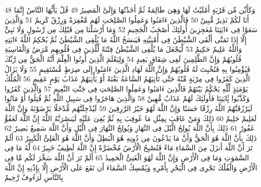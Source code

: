 \documentclass[20pt,a4paper]{article}
\begin{document}
{\tiny\colorbox{cl_aya}{48}} وَكَأَيِّن مِّن قَرْيَةٍ أَمْلَيْتُ لَهَا وَهِىَ ظَالِمَةٌ ثُمَّ أَخَذْتُهَا وَإِلَىَّ الْمَصِيرُ
{\tiny\colorbox{cl_aya}{49}} قُلْ يَأَيُّهَا النَّاسُ إِنَّمَا أَنَا لَكُمْ نَذِيرٌ مُّبِينٌ
{\tiny\colorbox{cl_aya}{50}} فَالَّذِينَ ءَامَنُوا وَعَمِلُوا الصَّلِحَتِ لَهُم مَّغْفِرَةٌ وَرِزْقٌ كَرِيمٌ
{\tiny\colorbox{cl_aya}{51}} وَالَّذِينَ سَعَوْا فِى ءَايَتِنَا مُعَجِزِينَ أُولَئِكَ أَصْحَبُ الْجَحِيمِ
{\tiny\colorbox{cl_aya}{52}} وَمَا أَرْسَلْنَا مِن قَبْلِكَ مِن رَّسُولٍ وَلَا نَبِىٍّ إِلَّا إِذَا تَمَنَّى أَلْقَى الشَّيْطَنُ فِى أُمْنِيَّتِهِ فَيَنسَخُ اللَّهُ مَا يُلْقِى الشَّيْطَنُ ثُمَّ يُحْكِمُ اللَّهُ ءَايَتِهِ وَاللَّهُ عَلِيمٌ حَكِيمٌ
{\tiny\colorbox{cl_aya}{53}} لِّيَجْعَلَ مَا يُلْقِى الشَّيْطَنُ فِتْنَةً لِّلَّذِينَ فِى قُلُوبِهِم مَّرَضٌ وَالْقَاسِيَةِ قُلُوبُهُمْ وَإِنَّ الظَّلِمِينَ لَفِى شِقَاقٍ بَعِيدٍ
{\tiny\colorbox{cl_aya}{54}} وَلِيَعْلَمَ الَّذِينَ أُوتُوا الْعِلْمَ أَنَّهُ الْحَقُّ مِن رَّبِّكَ فَيُؤْمِنُوا بِهِ فَتُخْبِتَ لَهُ قُلُوبُهُمْ وَإِنَّ اللَّهَ لَهَادِ الَّذِينَ ءَامَنُوا إِلَى صِرَطٍ مُّسْتَقِيمٍ
{\tiny\colorbox{cl_aya}{55}} وَلَا يَزَالُ الَّذِينَ كَفَرُوا فِى مِرْيَةٍ مِّنْهُ حَتَّى تَأْتِيَهُمُ السَّاعَةُ بَغْتَةً أَوْ يَأْتِيَهُمْ عَذَابُ يَوْمٍ عَقِيمٍ
{\tiny\colorbox{cl_aya}{56}} الْمُلْكُ يَوْمَئِذٍ لِّلَّهِ يَحْكُمُ بَيْنَهُمْ فَالَّذِينَ ءَامَنُوا وَعَمِلُوا الصَّلِحَتِ فِى جَنَّتِ النَّعِيمِ
{\tiny\colorbox{cl_aya}{57}} وَالَّذِينَ كَفَرُوا وَكَذَّبُوا بَِٔايَتِنَا فَأُولَئِكَ لَهُمْ عَذَابٌ مُّهِينٌ
{\tiny\colorbox{cl_aya}{58}} وَالَّذِينَ هَاجَرُوا فِى سَبِيلِ اللَّهِ ثُمَّ قُتِلُوا أَوْ مَاتُوا لَيَرْزُقَنَّهُمُ اللَّهُ رِزْقًا حَسَنًا وَإِنَّ اللَّهَ لَهُوَ خَيْرُ الرَّزِقِينَ
{\tiny\colorbox{cl_aya}{59}} لَيُدْخِلَنَّهُم مُّدْخَلًا يَرْضَوْنَهُ وَإِنَّ اللَّهَ لَعَلِيمٌ حَلِيمٌ
{\tiny\colorbox{cl_aya}{60}} ذَلِكَ وَمَنْ عَاقَبَ بِمِثْلِ مَا عُوقِبَ بِهِ ثُمَّ بُغِىَ عَلَيْهِ لَيَنصُرَنَّهُ اللَّهُ إِنَّ اللَّهَ لَعَفُوٌّ غَفُورٌ
{\tiny\colorbox{cl_aya}{61}} ذَلِكَ بِأَنَّ اللَّهَ يُولِجُ الَّيْلَ فِى النَّهَارِ وَيُولِجُ النَّهَارَ فِى الَّيْلِ وَأَنَّ اللَّهَ سَمِيعٌ بَصِيرٌ
{\tiny\colorbox{cl_aya}{62}} ذَلِكَ بِأَنَّ اللَّهَ هُوَ الْحَقُّ وَأَنَّ مَا يَدْعُونَ مِن دُونِهِ هُوَ الْبَطِلُ وَأَنَّ اللَّهَ هُوَ الْعَلِىُّ الْكَبِيرُ
{\tiny\colorbox{cl_aya}{63}} أَلَمْ تَرَ أَنَّ اللَّهَ أَنزَلَ مِنَ السَّمَاءِ مَاءً فَتُصْبِحُ الْأَرْضُ مُخْضَرَّةً إِنَّ اللَّهَ لَطِيفٌ خَبِيرٌ
{\tiny\colorbox{cl_aya}{64}} لَّهُ مَا فِى السَّمَوَتِ وَمَا فِى الْأَرْضِ وَإِنَّ اللَّهَ لَهُوَ الْغَنِىُّ الْحَمِيدُ
{\tiny\colorbox{cl_aya}{65}} أَلَمْ تَرَ أَنَّ اللَّهَ سَخَّرَ لَكُم مَّا فِى الْأَرْضِ وَالْفُلْكَ تَجْرِى فِى الْبَحْرِ بِأَمْرِهِ وَيُمْسِكُ السَّمَاءَ أَن تَقَعَ عَلَى الْأَرْضِ إِلَّا بِإِذْنِهِ إِنَّ اللَّهَ بِالنَّاسِ لَرَءُوفٌ رَّحِيمٌ
\end{document}

